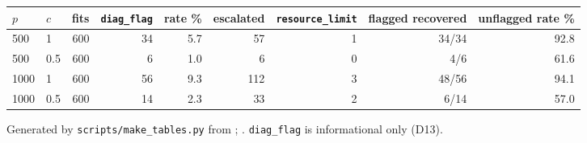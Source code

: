 \begin{center}
\scriptsize
\setlength{\tabcolsep}{3pt}
\begin{adjustbox}{max width=\linewidth}
\begin{tabular}{llrrrrrrr}
\toprule
$p$ & $c$ & fits & \texttt{diag\_flag} & rate \% & escalated & \texttt{resource\_limit} & flagged recovered & unflagged rate \% \\
\midrule
500 & 1 & 600 & 34 & 5.7 & 57 & 1 & 34/34 & 92.8 \\
500 & 0.5 & 600 & 6 & 1.0 & 6 & 0 & 4/6 & 61.6 \\
1000 & 1 & 600 & 56 & 9.3 & 112 & 3 & 48/56 & 94.1 \\
1000 & 0.5 & 600 & 14 & 2.3 & 33 & 2 & 6/14 & 57.0 \\
\bottomrule
\end{tabular}
\end{adjustbox}
\end{center}
\par{\footnotesize Generated by \texttt{scripts/make\_tables.py} from ; . \texttt{diag\_flag} is informational only (D13).}\par
